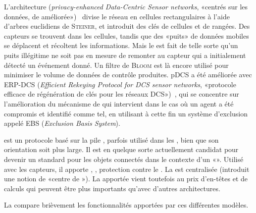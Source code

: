 L'architecture  (\textit{privacy-enhanced Data-Centric Sensor networks}, «\rcs centrés sur les données, de  améliorée»)~\cite{SZZCY09} divise le réseau en cellules rectangulaires à l'aide d'arbres euclidiens de \textsc{Steiner}, et introduit des clés de cellules et de rangées.
Des capteurs se trouvent dans les cellules, tandis que des «puits» de données mobiles se déplacent et récoltent les informations.
Mais le  est fait de telle sorte qu'un puits illégitime ne soit pas en mesure de remonter au capteur qui a initialement détecté un événement donné.
Un filtre de \textsc{Bloom} est là encore utilisé pour minimiser le volume de données de contrôle produites.
pDCS a été améliorée avec ERP-DCS (\textit{Efficient Rekeying Protocol for DCS sensor networks}, «protocole efficace de régénération de clés pour les réseaux DCS»)~\cite{HYD13}, qui se concentre sur l'amélioration du mécanisme de  qui intervient dans le cas où un agent a été compromis et identifié comme tel, en utilisant à cette fin un système d'exclusion appelé EBS (\textit{Exclusion Basis System}).

\zigbee\cite{zigbee} est un protocole basé sur la pile \ieeeff, parfois utilisé dans les \rcs, bien que son orientation soit plus large.
Il est en quelque sorte actuellement candidat pour devenir un standard pour les objets connectés dans le contexte d'un «».
Utilisé avec les capteurs, il apporte , , protection contre le .
La  est centralisée (\zigbee introduit une notion de «centre de »).
La \secu apportée vient toutefois au prix d'en-têtes et de calculs qui peuvent être plus importants qu'avec d'autres architectures.

La  compare brièvement les fonctionnalités apportées par ces différentes modèles.

